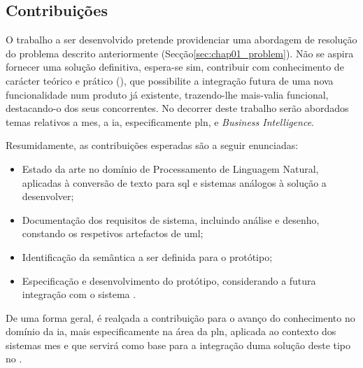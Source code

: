 \subsection{Contribuições}
\label{sec:chap01_contributions}
O trabalho a ser desenvolvido pretende providenciar uma abordagem de resolução do problema descrito anteriormente (Secção\ref{sec:chap01_problem}). Não se aspira fornecer uma solução definitiva, espera-se sim, contribuir com conhecimento de carácter teórico e prático (), que possibilite a integração futura de uma nova funcionalidade num produto já existente, trazendo-lhe mais-valia funcional, destacando-o dos seus concorrentes. No decorrer deste trabalho serão abordados temas relativos a \gls{mes}, a \gls{ia}, especificamente \gls{pln}, e \textit{Business Intelligence}.

Resumidamente, as contribuições esperadas são a seguir enunciadas:

\begin{itemize}
    \item
    {
        Estado da arte no domínio de Processamento de Linguagem Natural, aplicadas à conversão de texto para \gls{sql} e sistemas análogos à solução a desenvolver;
    }
    \item 
    {
        Documentação dos requisitos de sistema, incluindo análise e desenho, constando os respetivos artefactos de \gls{uml};
    }
    \item 
    {
        Identificação da semântica a ser definida para o protótipo;
    }
    \item
    {
        Especificação e desenvolvimento do protótipo, considerando a futura integração com o sistema {\productname}.
    }
\end{itemize}

De uma forma geral, é realçada a contribuição para o avanço do conhecimento no domínio da \gls{ia}, mais especificamente na área da \gls{pln}, aplicada ao contexto dos sistemas \gls{mes} e que servirá como base para a integração duma solução deste tipo no {\productname}.